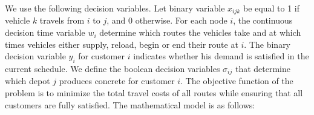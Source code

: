 \documentclass{article}
\begin{document}
{%

We use the following decision variables. Let binary variable $x_{ijk}$ be equal to 1 if vehicle $k$ travels from $i$ to $j$, and 0 otherwise. For each node $i$, the continuous decision time variable $w_i$ determine which routes the vehicles take and at which times vehicles either supply, reload, begin or end their route at $i$. The binary decision variable $y_i$ for customer $i$ indicates whether his demand is satisfied in the current schedule. We define the boolean decision variables $\sigma_{ij}$ that determine which depot $j$ produces concrete for customer $i$. The objective function of the problem is to minimize the total travel costs of all routes while ensuring that all customers are fully satisfied. The mathematical model is as follows:

}
\end{document}

